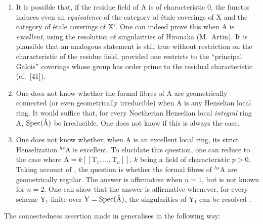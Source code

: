 \begin{remarks}[18.9.6]
\label{IV.18.9.6}
\begin{enumerate}[label=\emph{\roman*)}]
  \item It is possible that, if the residue field of A is of characteristic 0, the functor  induces even an \emph{equivalence} of the category of \'{e}tale coverings of X and the category of \'{e}tale coverings of $\mathrm{X}'$.
  One can indeed prove this when A is \emph{excellent}, using the resolution of singularities of Hironaka (M.~Artin).
  It is plausible that an analogous statement is still true without restriction on the characteristic of the residue field, provided one restricts to the ``principal Galois'' coverings whose group has order prime to the residual characteristic (cf.~[41]).

  \item One does not know whether the formal fibres of A are geometrically connected (or even geometrically irreducible) when A is any Henselian local ring.
  It would suffice that, for every Noetherian Henselian local \emph{integral} ring A, $\operatorname{Spec}(\hat{\mathrm{A}})$ be irreducible.
  One does not know if this is always the case.

  \item One does not know whether, when A is an excellent local ring, its strict Henselization ${}^{hs}\!\mathrm{A}$ is excellent.
  To elucidate this question, one can reduce to the case where $\mathrm{A}=k[[\mathrm{T}_1,\ldots,\mathrm{T}_n]]$, $k$ being a field of characteristic $p>0$.
  Taking account of , the question is whether the formal fibres of ${}^{hs}\!\mathrm{A}$ are geometrically regular.
  The answer is affirmative when $n=1$, but is not known for $n=2$.
  One can show that the answer is affirmative whenever, for every scheme $\mathrm{Y}_1$ finite over $\mathrm{Y}=\operatorname{Spec}(\hat{\mathrm{A}})$, the singularities of $\mathrm{Y}_1$ can be resolved .
\end{enumerate}
\end{remarks}

The connectedness assertion made in  generalises in the following way:

